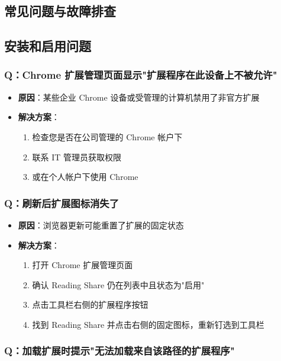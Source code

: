 \documentclass[10pt,a4paper]{article}
\begin{document}
\begin{itemize}
\begin{itemize}
\begin{itemize}
\section{常见问题与故障排查}

\subsection{安装和启用问题}

\subsubsection{Q：Chrome 扩展管理页面显示"扩展程序在此设备上不被允许"}

\begin{itemize}
  \item \textbf{原因}：某些企业 Chrome 设备或受管理的计算机禁用了非官方扩展
  \item \textbf{解决方案}：
    \begin{enumerate}
      \item 检查您是否在公司管理的 Chrome 帐户下
      \item 联系 IT 管理员获取权限
      \item 或在个人帐户下使用 Chrome
    \end{enumerate}
\end{itemize}

\subsubsection{Q：刷新后扩展图标消失了}

\begin{itemize}
  \item \textbf{原因}：浏览器更新可能重置了扩展的固定状态
  \item \textbf{解决方案}：
    \begin{enumerate}
      \item 打开 Chrome 扩展管理页面
      \item 确认 Reading Share 仍在列表中且状态为"启用"
      \item 点击工具栏右侧的扩展程序按钮
      \item 找到 Reading Share 并点击右侧的固定图标，重新钉选到工具栏
    \end{enumerate}
\end{itemize}

\subsubsection{Q：加载扩展时提示"无法加载来自该路径的扩展程序"}


\end{itemize}
\end{itemize}
\end{itemize}
\end{document}
